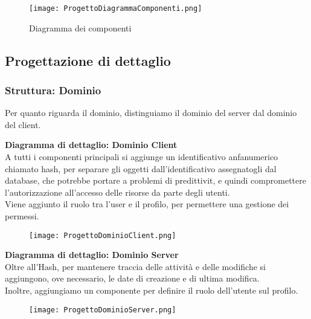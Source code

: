 \begin{figure}[h!]
    \begin{center}
        \texttt{[image: ProgettoDiagrammaComponenti.png]}
        \caption{Diagramma dei componenti}
    \end{center}
\end{figure}

\newpage

\subsection{Progettazione di dettaglio}

\subsubsection{Struttura: Dominio}

Per quanto riguarda il dominio, distinguiamo il dominio del server dal dominio del client.

\vspace{1em}

\textbf{Diagramma di dettaglio: Dominio Client}\\
A tutti i componenti principali si aggiunge un identificativo anfanumerico chiamato hash, 
per separare gli oggetti dall'identificativo assegnatogli dal database, che potrebbe portare a problemi di predittivit, e quindi compromettere l'autorizzazione all'accesso delle risorse da parte degli utenti.\\
Viene aggiunto il ruolo tra l'user e il profilo, per permettere una gestione dei permessi.
\begin{figure}[h!]
    \begin{center}
        \texttt{[image: ProgettoDominioClient.png]}
    \end{center}
\end{figure}
\clearpage
\textbf{Diagramma di dettaglio: Dominio Server}\\
Oltre all'Hash, per mantenere traccia delle attività e delle modifiche si aggiungono, ove necessario, 
le date di creazione e di ultima modifica.\\
Inoltre, aggiungiamo un componente per definire il ruolo dell'utente sul profilo.
\begin{figure}[h!]
    \begin{center}
        \texttt{[image: ProgettoDominioServer.png]}
    \end{center}
\end{figure}
\newpage



